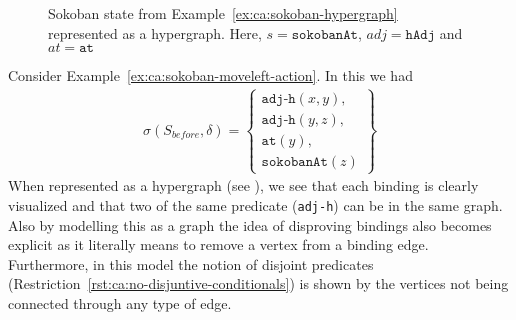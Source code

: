 \documentclass[../Master.tex]{subfiles}
\begin{document}
\begin{figure}
    \centering
        
        \caption{Sokoban state from Example~\ref{ex:ca:sokoban-hypergraph} represented as a hypergraph. Here, $s = \texttt{sokobanAt}$, $adj = \texttt{hAdj}$ and $at = \texttt{at}$}\label{fig:ca:sokoban-hypergraph}
\end{figure}

\begin{example}\label{ex:ca:sokoban-hypergraph}
	Consider Example~\ref{ex:ca:sokoban-moveleft-action}. In this we had
	\begin{align*}
		\sigma(S_{before}, \delta) =
			\left\{
			\begin{gathered}
				\texttt{adj-h}(x, y), \\
				\texttt{adj-h}(y, z), \\
				\texttt{at}(y), \\
				\texttt{sokobanAt}(z)
			\end{gathered}
			\right\}
	\end{align*}
	When represented as a hypergraph (see ),
	we see that each binding is clearly visualized and that two of the same predicate (\texttt{adj-h}) can be in the same graph.
	Also by modelling this as a graph the idea of disproving bindings also
	becomes explicit as it literally means to remove a vertex from a binding edge.
	Furthermore, in this model the notion of disjoint predicates (Restriction~\ref{rst:ca:no-disjuntive-conditionals}) is shown by the vertices not being connected through any type of edge.
\end{example}
\end{document}
